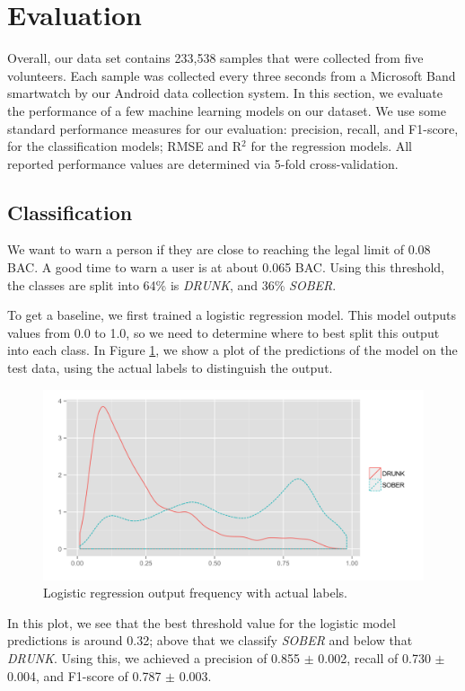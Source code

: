 \section{Evaluation}

Overall, our data set contains 233,538 samples that were collected from five volunteers. Each sample was collected every three seconds from a Microsoft Band smartwatch by our Android data collection system. In this section, we evaluate the performance of a few machine learning models on our dataset. We use some standard performance measures for our evaluation: precision, recall, and F1-score, for the classification models; RMSE and R$^2$ for the regression models. All reported performance values are determined via 5-fold cross-validation.

\subsection{Classification}

We want to warn a person if they are close to reaching the legal limit of 0.08 BAC. A good time to warn a user is at about 0.065 BAC. Using this threshold, the classes are split into 64\% is \textit{DRUNK}, and 36\% \textit{SOBER}.

To get a baseline, we first trained a logistic regression model. This model outputs values from 0.0 to 1.0, so we need to determine where to best split this output into each class. In Figure \ref{fig:log_pred_density}, we show a plot of the predictions of the model on the test data, using the actual labels to distinguish the output. \begin{figure}
	\includegraphics[width=1.0\textwidth]{../figs/log_pred_density}
	\caption{Logistic regression output frequency with actual labels.}
	\label{fig:log_pred_density}
\end{figure}In this plot, we see that the best threshold value for the logistic model predictions is around 0.32; above that we classify \textit{SOBER} and below that \textit{DRUNK}. Using this, we achieved a precision of 0.855 $\pm$ 0.002, recall of 0.730 $\pm$ 0.004, and F1-score of 0.787 $\pm$ 0.003.

